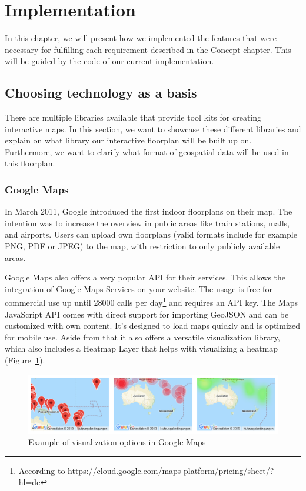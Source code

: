 \section{Implementation}
In this chapter, we will present how we implemented the features that were necessary for fulfilling each requirement described in the Concept chapter. This will be guided by the code of our current implementation.

\subsection{Choosing technology as a basis}

There are multiple libraries available that provide tool kits for creating interactive maps. In this section, we want to showcase these different libraries and explain on what library our interactive floorplan will be built up on. Furthermore, we want to clarify what format of geospatial data will be used in this floorplan.

\subsubsection{Google Maps}
\label{Google Maps}

In March 2011, Google introduced the first indoor floorplans on their map. The intention was to increase the overview in public areas like train stations, malls, and airports.
Users can upload own floorplans (valid formats include for example PNG, PDF or JPEG) to the map, with restriction to only publicly available areas.

Google Maps also offers a very popular API for their services. This allows the integration of Google Maps Services on your website. The usage is free for commercial use up until 28000 calls per day\footnote{According to \url{https://cloud.google.com/maps-platform/pricing/sheet/?hl=de}} and requires an API key.
The Maps JavaScript API comes with direct support for importing GeoJSON and can be customized with own content. It's designed to load maps quickly and is optimized for mobile use. Aside from that it also offers a versatile visualization library, which also includes a Heatmap Layer that helps with visualizing a heatmap (Figure~\ref{fig:GoogleMapsHeatmap}).

\begin{figure}[!hb]
    \centering
    \includegraphics[width=1\linewidth]{images/GoogleMapsHeatmap}
    \caption{Example of visualization options in Google Maps}
    \label{fig:GoogleMapsHeatmap}
\end{figure}

